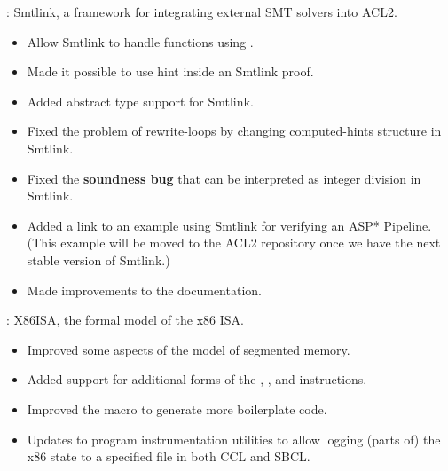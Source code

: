 \begin{frame}

\implibtitle

:
Smtlink, a framework for integrating external SMT solvers into ACL2.
\begin{itemize}
\item
Allow Smtlink to handle functions using .
\item
Made it possible to use  hint inside an Smtlink proof.
\item
Added abstract type support for Smtlink.
\item
Fixed the problem of rewrite-loops by changing computed-hints structure in Smtlink.
\item
Fixed the {\color{red} \bf{soundness bug}} that  can be interpreted as integer division in Smtlink.
\item
Added a link to an example using Smtlink for verifying an ASP* Pipeline. (This example will be moved to the ACL2 repository once we have the next stable version of Smtlink.)
\item
Made improvements to the documentation.
\end{itemize}

\end{frame}


\begin{frame}

\implibtitle

:
X86ISA, the formal model of the x86 ISA.
\begin{itemize}
\item
Improved some aspects of the model of segmented memory.
\item
Added support for additional forms of the
, , and  instructions.
\item
Improved the  macro to generate more boilerplate code.
\item
Updates to program instrumentation utilities to allow logging (parts of) the x86 state to a specified file in both CCL and SBCL.
\end{itemize}

\end{frame}


